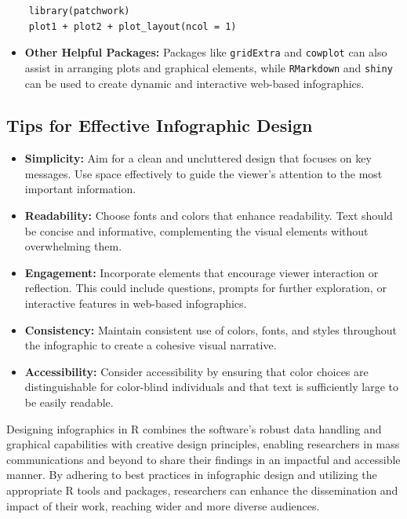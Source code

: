 \documentclass[
]{book}
\providecommand{\tightlist}{%
  \setlength{\itemsep}{0pt}\setlength{\parskip}{0pt}}
\begin{document}
\begin{verbatim}
    library(patchwork)
    plot1 + plot2 + plot_layout(ncol = 1)
\end{verbatim}

\begin{itemize}
\tightlist
\item
  \textbf{Other Helpful Packages:} Packages like \texttt{gridExtra} and \texttt{cowplot} can also assist in arranging plots and graphical elements, while \texttt{RMarkdown} and \texttt{shiny} can be used to create dynamic and interactive web-based infographics.
\end{itemize}

\subsection{Tips for Effective Infographic Design}\label{tips-for-effective-infographic-design}

\begin{itemize}
\item
  \textbf{Simplicity:} Aim for a clean and uncluttered design that focuses on key messages. Use space effectively to guide the viewer's attention to the most important information.
\item
  \textbf{Readability:} Choose fonts and colors that enhance readability. Text should be concise and informative, complementing the visual elements without overwhelming them.
\item
  \textbf{Engagement:} Incorporate elements that encourage viewer interaction or reflection. This could include questions, prompts for further exploration, or interactive features in web-based infographics.
\item
  \textbf{Consistency:} Maintain consistent use of colors, fonts, and styles throughout the infographic to create a cohesive visual narrative.
\item
  \textbf{Accessibility:} Consider accessibility by ensuring that color choices are distinguishable for color-blind individuals and that text is sufficiently large to be easily readable.
\end{itemize}

Designing infographics in R combines the software's robust data handling and graphical capabilities with creative design principles, enabling researchers in mass communications and beyond to share their findings in an impactful and accessible manner. By adhering to best practices in infographic design and utilizing the appropriate R tools and packages, researchers can enhance the dissemination and impact of their work, reaching wider and more diverse audiences.
\end{document}
